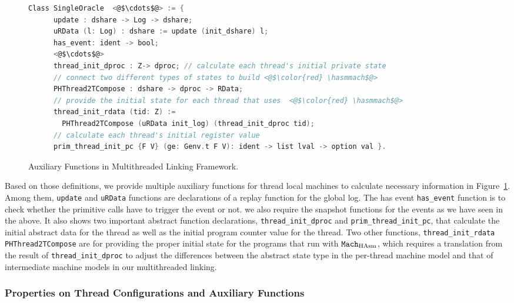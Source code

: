 \begin{figure}
\begin{lstlisting}[language=C, morekeywords={Class}]
  Class SingleOracle  <@$\cdots$@> := {
      update : dshare -> Log -> dshare;
      uRData (l: Log) : dshare := update (init_dshare) l;
      has_event: ident -> bool;      
      <@$\cdots$@>
      thread_init_dproc : Z-> dproc; // calculate each thread's initial private state
      // connect two different types of states to build <@$\color{red} \hasmmach$@>
      PHThread2TCompose : dshare -> dproc -> RData; 
      // provide the initial state for each thread that uses  <@$\color{red} \hasmmach$@>
      thread_init_rdata (tid: Z) :=
        PHThread2TCompose (uRData init_log) (thread_init_dproc tid);
      // calculate each thread's initial register value
      prim_thread_init_pc {F V} (ge: Genv.t F V): ident -> list lval -> option val }.
\end{lstlisting}
\caption{Auxiliary Functions in Multithreaded Linking Framework.}
\label{fig:chapter:conlink:multithreaded-linking-aux-functions}
\end{figure}

Based on those definitions, we provide multiple auxiliary functions 
for thread local machines to calculate necessary information in Figure~\ref{fig:chapter:conlink:multithreaded-linking-aux-functions}.
Among them,  \lstinline$update$ and \lstinline$uRData$ functions are  declarations of a replay function for the global log. 
The has event \lstinline$has_event$ function is to check whether the primitive calls have to trigger the event or not. 
we also require the snapshot functions for the events as we have seen in the above.
It also shows two important abstract function declarations, \lstinline$thread_init_dproc$ and \lstinline$prim_thread_init_pc$, that calculate the initial abstract data for the thread as well as the initial program counter value for the thread. 
Two other functions, \lstinline$thread_init_rdata$ \lstinline$PHThread2TCompose$ are for providing the proper initial state for the programs that run with ${\mathrm{\texttt{Mach}}}_{\mathrm{HAsm}}$, 
which requires a translation from the result of \lstinline$thread_init_dproc$   to adjust the differences between
the abstract state type in the per-thread machine model and that of intermediate machine models in our multithreaded linking. 

\subsubsection{Properties on Thread Configurations and Auxiliary Functions}


